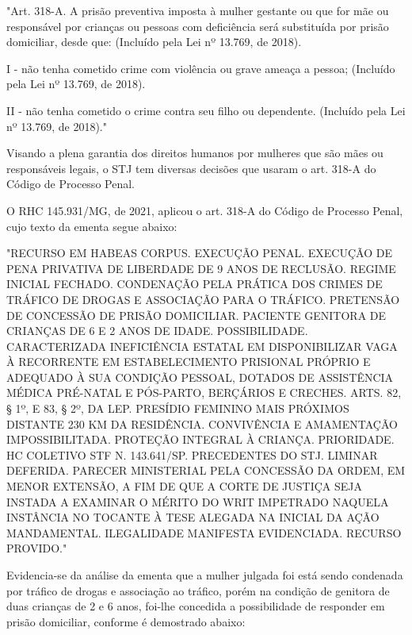 \noindent
\begin{flushleft}
\setlength{\leftskip}{4cm}
\small
"Art. 318-A.  A prisão preventiva imposta à mulher gestante ou que for mãe ou responsável por crianças ou pessoas com deficiência será substituída por prisão domiciliar, desde que: (Incluído pela Lei nº 13.769, de 2018).

I - não tenha cometido crime com violência ou grave ameaça a pessoa;              (Incluído pela Lei nº 13.769, de 2018).

II - não tenha cometido o crime contra seu filho ou dependente. (Incluído pela Lei nº 13.769, de 2018)." \cite{cpp}
\end{flushleft}

Visando a plena garantia dos direitos humanos por mulheres que são mães ou responsáveis legais, o STJ tem diversas decisões que usaram o art. 318-A do Código de Processo Penal. 

O RHC 145.931/MG, de 2021, aplicou o art. 318-A do Código de Processo Penal, cujo texto da ementa segue abaixo:

\noindent
\begin{flushleft}
\setlength{\leftskip}{4cm}
\small
"RECURSO EM HABEAS CORPUS. EXECUÇÃO PENAL.	EXECUÇÃO DE PENA PRIVATIVA DE LIBERDADE DE 9 ANOS DE RECLUSÃO. REGIME INICIAL FECHADO. CONDENAÇÃO PELA PRÁTICA DOS CRIMES DE TRÁFICO DE DROGAS E ASSOCIAÇÃO PARA O TRÁFICO. PRETENSÃO DE CONCESSÃO DE PRISÃO DOMICILIAR. PACIENTE GENITORA DE CRIANÇAS DE 6 E 2 ANOS DE IDADE. POSSIBILIDADE. CARACTERIZADA INEFICIÊNCIA ESTATAL EM DISPONIBILIZAR VAGA À RECORRENTE EM ESTABELECIMENTO PRISIONAL PRÓPRIO E ADEQUADO À SUA CONDIÇÃO PESSOAL, DOTADOS DE ASSISTÊNCIA MÉDICA PRÉ-NATAL E PÓS-PARTO, BERÇÁRIOS E CRECHES. ARTS. 82, § 1º, E 83, § 2º, DA LEP. PRESÍDIO FEMININO MAIS PRÓXIMOS DISTANTE 230 KM DA RESIDÊNCIA. CONVIVÊNCIA E AMAMENTAÇÃO IMPOSSIBILITADA. PROTEÇÃO INTEGRAL À CRIANÇA. PRIORIDADE. HC COLETIVO STF N. 143.641/SP. PRECEDENTES DO STJ. LIMINAR DEFERIDA. PARECER MINISTERIAL PELA CONCESSÃO DA ORDEM, EM MENOR EXTENSÃO, A FIM DE QUE A CORTE DE JUSTIÇA SEJA INSTADA A EXAMINAR O MÉRITO DO WRIT IMPETRADO NAQUELA INSTÂNCIA NO TOCANTE À TESE ALEGADA NA INICIAL DA AÇÃO MANDAMENTAL. ILEGALIDADE MANIFESTA 	EVIDENCIADA. RECURSO PROVIDO." \cite{rhc145931}
\end{flushleft}

Evidencia-se da análise da ementa que a mulher julgada foi está sendo condenada por tráfico de drogas e associação ao tráfico, porém na condição de genitora de duas crianças de 2 e 6 anos, foi-lhe concedida a possibilidade de responder em prisão domiciliar, conforme é demostrado abaixo:

